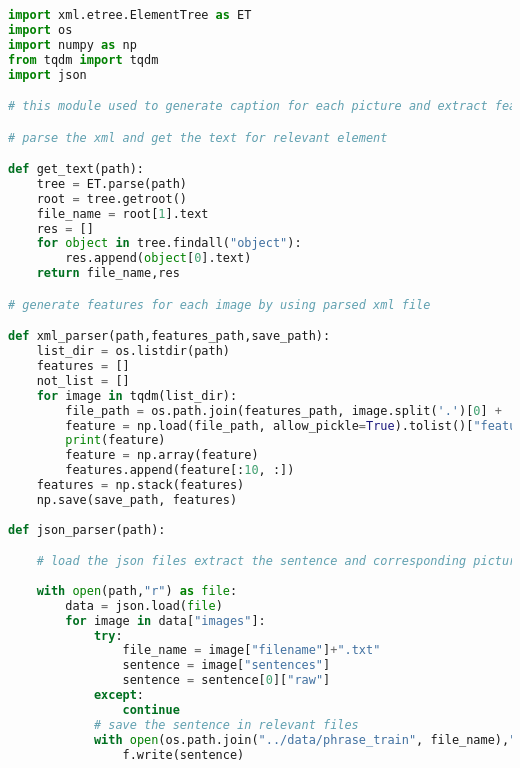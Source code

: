 \begin{lstlisting}[language=Python]
import xml.etree.ElementTree as ET
import os
import numpy as np
from tqdm import tqdm
import json

# this module used to generate caption for each picture and extract features base on the corresponding caption

# parse the xml and get the text for relevant element

def get_text(path):
    tree = ET.parse(path)
    root = tree.getroot()
    file_name = root[1].text
    res = []
    for object in tree.findall("object"):
        res.append(object[0].text)
    return file_name,res

# generate features for each image by using parsed xml file

def xml_parser(path,features_path,save_path):
    list_dir = os.listdir(path)
    features = []
    not_list = []
    for image in tqdm(list_dir):
        file_path = os.path.join(features_path, image.split('.')[0] + '.npy')
        feature = np.load(file_path, allow_pickle=True).tolist()["features"]
        print(feature)
        feature = np.array(feature)
        features.append(feature[:10, :])
    features = np.stack(features)
    np.save(save_path, features)
    
def json_parser(path):

    # load the json files extract the sentence and corresponding picture name.
    
    with open(path,"r") as file:
        data = json.load(file)
        for image in data["images"]:
            try:
                file_name = image["filename"]+".txt"
                sentence = image["sentences"]
                sentence = sentence[0]["raw"]
            except:
                continue
            # save the sentence in relevant files
            with open(os.path.join("../data/phrase_train", file_name),"w") as f:
                f.write(sentence)
                
\end{lstlisting}

